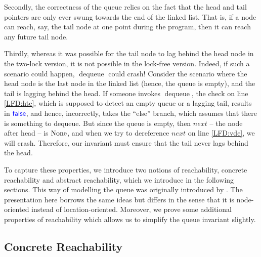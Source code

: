 \documentclass[a4paper, 10pt]{report}
\theoremstyle{definition}
\newcommand{\dequeue}{\operatorname{dequeue}}
\begin{document}
Secondly, the correctness of the queue relies on the fact that the head and tail pointers are only ever swung towards the end of the linked list. That is, if a node can reach, say, the tail node at one point during the program, then it can reach any future tail node.

Thirdly, whereas it was possible for the tail node to lag behind the head node in the two-lock version, it is not possible in the lock-free version. Indeed, if such a scenario could happen, $\dequeue$ could crash! Consider the scenario where the head node is the last node in the linked list (hence, the queue is empty), and the tail is lagging behind the head. If someone invokes $\dequeue$, the check on line \ref{LFD:hte}, which is supposed to detect an empty queue or a lagging tail, results in $\textsf{\color{blue} false}$, and hence, incorrectly, takes the ``else'' branch, which assumes that there is something to dequeue. But since the queue is empty, then $next$ -- the node after head -- is $\operatorname{None}$, and when we try to dereference $next$ on line \ref{LFD:vde}, we will crash. Therefore, our invariant must ensure that the tail never lags behind the head.

To capture these properties, we introduce two notions of reachability, concrete reachability and abstract reachability, which we introduce in the following sections. This way of modelling the queue was originally introduced by \citet{DBLP:conf/cpp/VindumB21}. The presentation here borrows the same ideas but differs in the sense that it is node-oriented instead of location-oriented. Moreover, we prove some additional properties of reachability which allows us to simplify the queue invariant slightly.

\subsection{Concrete Reachability}
\label{LFMSQSPECS:reachability:sub:concrete}
\end{document}
